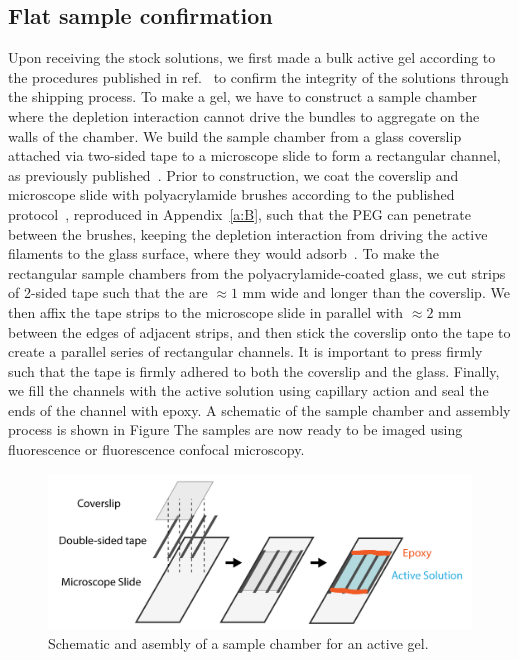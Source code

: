 \subsection{Flat sample confirmation}
Upon receiving the stock solutions, we first made a bulk active gel according to the procedures published in ref.~\cite{RN3} to confirm the integrity of the solutions through the shipping process.
To make a gel, we have to construct a sample chamber where the depletion interaction cannot drive the bundles to aggregate on the walls of the chamber.
We build the sample chamber from a glass coverslip attached via two-sided tape to a microscope slide to form a rectangular channel, as previously published~\cite{RN3}.
Prior to construction, we coat the coverslip and microscope slide with polyacrylamide brushes according to the published protocol~\cite{RN3}, reproduced in Appendix~\ref{a:B}, such that the PEG can penetrate between the brushes, keeping the depletion interaction from driving the active filaments to the glass surface, where they would adsorb~\cite{RN3}.
To make the rectangular sample chambers from the polyacrylamide-coated glass, we cut strips of 2-sided tape such that the are $\approx1$ mm wide and longer than the coverslip.
We then affix the tape strips to the microscope slide in parallel with $\approx 2$ mm between the edges of adjacent strips, and then stick the coverslip onto the tape to create a parallel series of rectangular channels.
It is important to press firmly such that the tape is firmly adhered to both the coverslip and the glass.
Finally, we fill the channels with the active solution using capillary action and seal the ends of the channel with epoxy.
A schematic of the sample chamber and assembly process is shown in Figure
The samples are now ready to be imaged using fluorescence or fluorescence confocal microscopy.
\begin{figure}
  \centering
  \includegraphics{figures/C3/Ch3-Figs_GelSampleChamber.png}
  \caption{Schematic and asembly of a sample chamber for an active gel.}
  \label{f:3-SampleChamber}
\end{figure}

